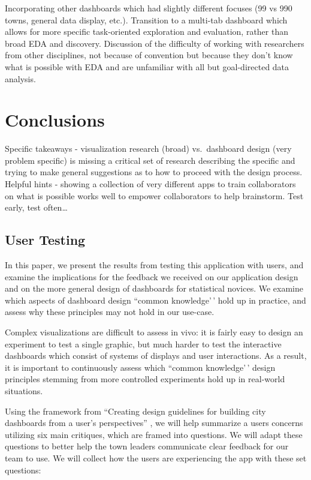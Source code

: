 \documentclass[letterpaper,inpress]{jdsart}
\begin{document}
Incorporating other dashboards which had slightly different focuses (99 vs 990 towns, general data display, etc.). Transition to a multi-tab dashboard which allows for more specific task-oriented exploration and evaluation, rather than broad EDA and discovery.
Discussion of the difficulty of working with researchers from other disciplines, not because of convention but because they don't know what is possible with EDA and are unfamiliar with all but goal-directed data analysis.

\hypertarget{conclusions}{%
\section{Conclusions}\label{conclusions}}

Specific takeaways - visualization research (broad) vs.~dashboard design (very problem specific) is missing a critical set of research describing the specific and trying to make general suggestions as to how to proceed with the design process.
Helpful hints - showing a collection of very different apps to train collaborators on what is possible works well to empower collaborators to help brainstorm.
Test early, test often\ldots{}

\subsection{User Testing}

In this paper, we present the results from testing this application with users, and examine the implications for the feedback we received on our application design and on the more general design of dashboards for statistical novices. We examine which aspects of dashboard design ``common knowledge'\,' hold up in practice, and assess why these principles may not hold in our use-case.

Complex visualizations are difficult to assess in vivo: it is fairly easy to design an experiment to test a single graphic, but much harder to test the interactive dashboards which consist of systems of displays and user interactions. As a result, it is important to continuously assess which ``common knowledge'\,' design principles stemming from more controlled experiments hold up in real-world situations.

Using the framework from ``Creating design guidelines for building city dashboards from a user's perspectives'' \citep{lee}, we will help summarize a users concerns utilizing six main critiques, which are framed into questions. We will adapt these questions to better help the town leaders communicate clear feedback for our team to use. We will collect how the users are experiencing the app with these set questions:
\end{document}
